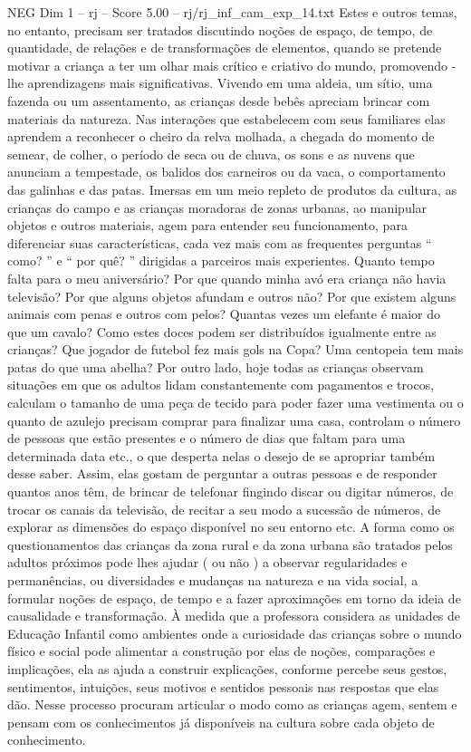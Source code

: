 \begin{textsample}{NEG Dim 1 – rj – Score 5.00 – rj/rj\_inf\_cam\_exp\_14.txt}
Estes e outros temas, no entanto, precisam ser tratados discutindo noções de espaço, de tempo, de quantidade, de relações e de transformações de elementos, quando se pretende motivar a criança a ter um olhar mais crítico e criativo do mundo, promovendo -lhe aprendizagens mais significativas.
Vivendo em uma aldeia, um sítio, uma fazenda ou um assentamento, as crianças desde bebês apreciam brincar com materiais da natureza.
Nas interações que estabelecem com seus familiares elas aprendem a reconhecer o cheiro da relva molhada, a chegada do momento de semear, de colher, o período de seca ou de chuva, os sons e as nuvens que anunciam a tempestade, os balidos dos carneiros ou da vaca, o comportamento das galinhas e das patas.
Imersas em um meio repleto de produtos da cultura, as crianças do campo e as crianças moradoras de zonas urbanas, ao manipular objetos e outros materiais, agem para entender seu funcionamento, para diferenciar suas características, cada vez mais com as frequentes perguntas “ como? ” e “ por quê? ” dirigidas a parceiros mais experientes.
Quanto tempo falta para o meu aniversário?
Por que quando minha avó era criança não havia televisão?
Por que alguns objetos afundam e outros não?
Por que existem alguns animais com penas e outros com pelos?
Quantas vezes um elefante é maior do que um cavalo?
Como estes doces podem ser distribuídos igualmente entre as crianças?
Que jogador de futebol fez mais gols na Copa?
Uma centopeia tem mais patas do que uma abelha?
Por outro lado, hoje todas as crianças observam situações em que os adultos lidam constantemente com pagamentos e trocos, calculam o tamanho de uma peça de tecido para poder fazer uma vestimenta ou o quanto de azulejo precisam comprar para finalizar uma casa, controlam o número de pessoas que estão presentes e o número de dias que faltam para uma determinada data etc., o que desperta nelas o desejo de se apropriar também desse saber.
Assim, elas gostam de perguntar a outras pessoas e de responder quantos anos têm, de brincar de telefonar fingindo discar ou digitar números, de trocar os canais da televisão, de recitar a seu modo a sucessão de números, de explorar as dimensões do espaço disponível no seu entorno etc.
A forma como os questionamentos das crianças da zona rural e da zona urbana são tratados pelos adultos próximos pode lhes ajudar ( ou não ) a observar regularidades e permanências, ou diversidades e mudanças na natureza e na vida social, a formular noções de espaço, de tempo e a fazer aproximações em torno da ideia de causalidade e transformação.
À medida que a professora considera as unidades de Educação Infantil como ambientes onde a curiosidade das crianças sobre o mundo físico e social pode alimentar a construção por elas de noções, comparações e implicações, ela as ajuda a construir explicações, conforme percebe seus gestos, sentimentos, intuições, seus motivos e sentidos pessoais nas respostas que elas dão.
Nesse processo procuram articular o modo como as crianças agem, sentem e pensam com os conhecimentos já disponíveis na cultura sobre cada objeto de conhecimento.

\end{textsample}
